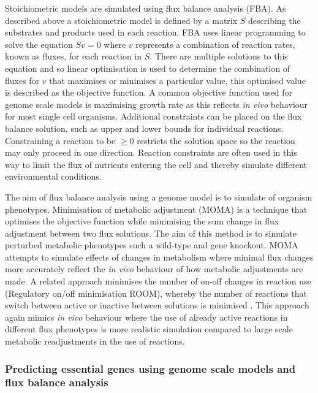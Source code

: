Stoichiometric models are simulated using flux balance analysis (FBA). As described above a stoichiometric model is defined by a matrix $S$ describing the substrates and products used in each reaction. FBA uses linear programming to solve the equation $S v = 0$ where $v$ represents a combination of reaction rates, known as fluxes, for each reaction in $S$. There are multiple solutions to this equation and so linear optimisation is used to determine the combination of fluxes for $v$ that maximises or minimises a particular value, this optimised value is described as the objective function. A common objective function used for genome scale models is maximising growth rate as this reflects \emph{in vivo} behaviour for most single cell organisms. Additional constraints can be placed on the flux balance solution, such as upper and lower bounds for individual reactions. Constraining a reaction to be $\geq 0$ restricts the solution space so the reaction may only proceed in one direction. Reaction constraints are often used in this way to limit the flux of nutrients entering the cell and thereby simulate different environmental conditions.

The aim of flux balance analysis using a genome model is to simulate of organism phenotypes. Minimisation of metabolic adjustment (MOMA) \cite{segre2002,burgard2003} is a technique that optimises the objective function while minimising the sum change in flux adjustment between two flux solutions. The aim of this method is to simulate perturbed metabolic phenotypes such a wild-type and gene knockout. MOMA attempts to simulate effects of changes in metabolism where minimal flux changes more accurately reflect the \emph{in vivo} behaviour of how metabolic adjustments are made. A related approach minimises the number of on-off changes in reaction use (Regulatory on/off minimisation ROOM), whereby the number of reactions that switch between active or inactive between solutions is minimised \cite{shlomi2005}. This approach again mimics \emph{in vivo} behaviour where the use of already active reactions in different flux phenotypes is more realistic simulation compared to large scale metabolic readjustments in the use of reactions.

\subsubsection{Predicting essential genes using genome scale models and flux balance analysis}

